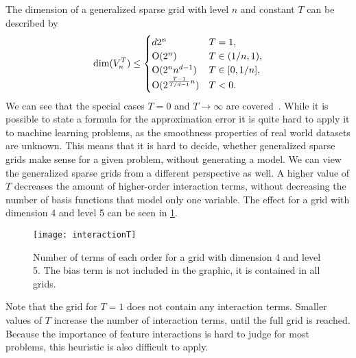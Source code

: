 The dimension of a generalized sparse grid with level \(n\) and constant \(T\) can be described by
\begin{equation*}
  \operatorname{dim}(V^T_n) \leq
  \begin{cases}
    d 2^n & T = 1, \\
    \operatorname{O}(2^n) & T \in (1/n, 1),\\
    \operatorname{O}(2^n n^{d-1}) & T \in [0, 1/n],\\
    \operatorname{O}(2^{\frac{T - 1}{T/d - 1} n}) & T < 0.
  \end{cases}
\end{equation*}
We can see that the special cases \(T = 0\) and \(T \to \infty\) are covered~\cite{optimizedApproxSpaces}.
While it is possible to state a formula for the approximation error it is quite hard to
apply it to machine learning problems, as the smoothness properties of real world
datasets are unknown.
This means that it is hard to decide, whether generalized sparse grids make
sense for a given problem, without generating a model.
We can view the generalized sparse grids from a different perspective as well.
A higher value of \(T\) decreases the amount of higher-order interaction terms,
without decreasing the number of basis functions that model only one variable.
The effect for a grid with dimension 4 and level 5 can be seen in \cref{fig:interaction-T}.
\begin{figure}[thb]
\texttt{[image: interactionT]}
\caption{Number of terms of each order for a grid with dimension 4 and level 5.
The bias term is not included in the graphic, it is contained in all grids.}\label{fig:interaction-T}
\end{figure}
Note that the grid for \(T = 1\) does not contain any interaction terms.
Smaller values of \(T\) increase the number of interaction terms, until the full
grid is reached.
  Because the importance of feature interactions is hard to judge for most problems, this heuristic is also difficult to apply.


